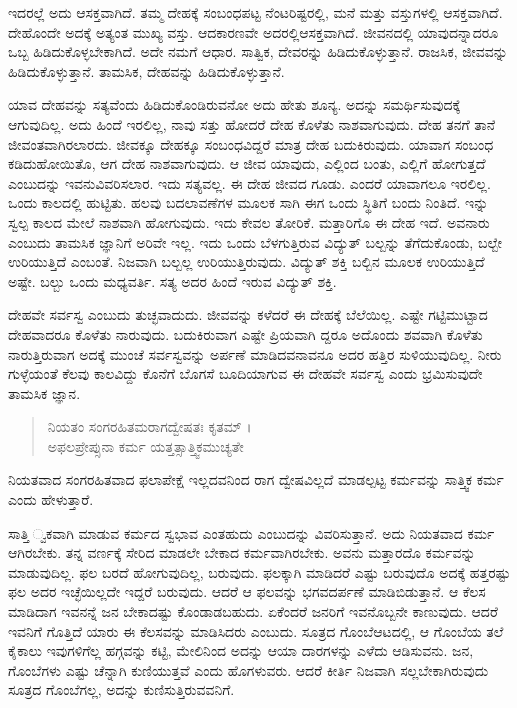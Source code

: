 ಇದರಲ್ಲೆ ಅದು ಆಸಕ್ತವಾಗಿದೆ. ತಮ್ಮ ದೇಹಕ್ಕೆ ಸಂಬಂಧಪಟ್ಟ ನೆಂಟರಿಷ್ಟರಲ್ಲಿ, ಮನೆ ಮತ್ತು ವಸ್ತುಗಳಲ್ಲಿ ಆಸಕ್ತವಾಗಿದೆ. ದೇಹೊಂದೇ ಅದಕ್ಕೆ ಅತ್ಯಂತ ಮುಖ್ಯ ವಸ್ತು. ಆದಕಾರಣವೇ ಅದರಲ್ಲಿಆಸಕ್ತವಾಗಿದೆ. ಜೀವನದಲ್ಲಿ ಯಾವುದನ್ನಾದರೂ ಒಬ್ಬ ಹಿಡಿದುಕೊಳ್ಳಬೇಕಾಗಿದೆ. ಅದೇ ನಮಗೆ ಆಧಾರ. ಸಾತ್ವಿಕ, ದೇವರನ್ನು ಹಿಡಿದುಕೊಳ್ಳುತ್ತಾನೆ. ರಾಜಸಿಕ, ಜೀವವನ್ನು ಹಿಡಿದುಕೊಳ್ಳುತ್ತಾನೆ. ತಾಮಸಿಕ, ದೇಹವನ್ನು ಹಿಡಿದುಕೊಳ್ಳುತ್ತಾನೆ.

ಯಾವ ದೇಹವನ್ನು ಸತ್ಯವೆಂದು ಹಿಡಿದುಕೊಂಡಿರುವನೋ ಅದು ಹೇತು ಶೂನ್ಯ. ಅದನ್ನು ಸಮರ್ಥಿಸುವುದಕ್ಕೆ ಆಗುವುದಿಲ್ಲ. ಅದು ಹಿಂದೆ ಇರಲಿಲ್ಲ, ನಾವು ಸತ್ತು ಹೋದರೆ ದೇಹ ಕೊಳೆತು ನಾಶವಾಗುವುದು. ದೇಹ ತನಗೆ ತಾನೆ ಜೀವಂತವಾಗಿರಲಾರದು. ಜೀವಕ್ಕೂ ದೇಹಕ್ಕೂ ಸಂಬಂಧವಿದ್ದರೆ ಮಾತ್ರ ದೇಹ ಬದುಕಿರುವುದು. ಯಾವಾಗ ಸಂಬಂಧ ಕಡಿದುಹೋಯಿತೊ, ಆಗ ದೇಹ ನಾಶವಾಗುವುದು. ಆ ಜೀವ ಯಾವುದು, ಎಲ್ಲಿಂದ ಬಂತು, ಎಲ್ಲಿಗೆ ಹೋಗುತ್ತದೆ ಎಂಬುದನ್ನು ಇವನುವಿವರಿಸಲಾರ. ಇದು ಸತ್ಯವಲ್ಲ. ಈ ದೇಹ ಜೀವದ ಗೂಡು. ಎಂದರೆ ಯಾವಾಗಲೂ ಇರಲಿಲ್ಲ. ಒಂದು ಕಾಲದಲ್ಲಿ ಹುಟ್ಟಿತು. ಹಲವು ಬದಲಾವಣೆಗಳ ಮೂಲಕ ಸಾಗಿ ಈಗ ಒಂದು ಸ್ಥಿತಿಗೆ ಬಂದು ನಿಂತಿದೆ. ಇನ್ನು ಸ್ವಲ್ಪ ಕಾಲದ ಮೇಲೆ ನಾಶವಾಗಿ ಹೋಗುವುದು. ಇದು ಕೇವಲ ತೋರಿಕೆ. ಮತ್ತಾರಿಗೊ ಈ ದೇಹ ಇದೆ. ಅವನಾರು ಎಂಬುದು ತಾಮಸಿಕ ಜ್ಞಾನಿಗೆ ಅರಿವೇ ಇಲ್ಲ. ಇದು ಒಂದು ಬೆಳಗುತ್ತಿರುವ ವಿದ್ಯುತ್ ಬಲ್ಬನ್ನು ತೆಗೆದುಕೊಂಡು, ಬಲ್ಬೇ ಉರಿಯುತ್ತಿದೆ ಎಂಬಂತೆ. ನಿಜವಾಗಿ ಬಲ್ಬಲ್ಲ ಉರಿಯುತ್ತಿರುವುದು. ವಿದ್ಯುತ್ ಶಕ್ತಿ ಬಲ್ಬಿನ ಮೂಲಕ ಉರಿಯುತ್ತಿದೆ ಅಷ್ಟೇ. ಬಲ್ಬು ಒಂದು ಮಧ್ಯವರ್ತಿ. ಸತ್ಯ ಅದರ ಹಿಂದೆ ಇರುವ ವಿದ್ಯುತ್ ಶಕ್ತಿ.

ದೇಹವೇ ಸರ್ವಸ್ವ ಎಂಬುದು ತುಚ್ಛವಾದುದು. ಜೀವವನ್ನು ಕಳೆದರೆ ಈ ದೇಹಕ್ಕೆ ಬೆಲೆಯಿಲ್ಲ. ಎಷ್ಟೇ ಗಟ್ಟಿಮುಟ್ಟಾದ ದೇಹವಾದರೂ ಕೊಳೆತು ನಾರುವುದು. ಬದುಕಿರುವಾಗ ಎಷ್ಟೇ ಪ್ರಿಯವಾಗಿ ದ್ದರೂ ಅದೊಂದು ಶವವಾಗಿ ಕೊಳೆತು ನಾರುತ್ತಿರುವಾಗ ಅದಕ್ಕೆ ಮುಂಚೆ ಸರ್ವಸ್ವವನ್ನು ಅರ್ಪಣೆ ಮಾಡಿದವನಾವನೂ ಅದರ ಹತ್ತಿರ ಸುಳಿಯುವುದಿಲ್ಲ. ನೀರು ಗುಳ್ಳೆಯಂತೆ ಕೆಲವು ಕಾಲವಿದ್ದು ಕೊನೆಗೆ ಬೊಗಸೆ ಬೂದಿಯಾಗುವ ಈ ದೇಹವೇ ಸರ್ವಸ್ವ ಎಂದು ಭ್ರಮಿಸುವುದೇ ತಾಮಸಿಕ ಜ್ಞಾನ.

\begin{verse}
ನಿಯತಂ ಸಂಗರಹಿತಮರಾಗದ್ವೇಷತಃ ಕೃತಮ್ ।\\ಅಫಲಪ್ರೇಪ್ಸುನಾ ಕರ್ಮ ಯತ್ತತ್ಸಾತ್ತ್ವಿಕಮುಚ್ಯತೇ 
\end{verse}

{\small ನಿಯತವಾದ ಸಂಗರಹಿತವಾದ ಫಲಾಪೇಕ್ಷೆ ಇಲ್ಲದವನಿಂದ ರಾಗ ದ್ವೇಷವಿಲ್ಲದೆ ಮಾಡಲ್ಪಟ್ಟ ಕರ್ಮವನ್ನು ಸಾತ್ತ್ವಿಕ ಕರ್ಮ ಎಂದು ಹೇಳುತ್ತಾರೆ.}

ಸಾತ್ತಿ ್ವಕವಾಗಿ ಮಾಡುವ ಕರ್ಮದ ಸ್ವಭಾವ ಎಂತಹುದು ಎಂಬುದನ್ನು ವಿವರಿಸುತ್ತಾನೆ. ಅದು ನಿಯತವಾದ ಕರ್ಮ ಆಗಿರಬೇಕು. ತನ್ನ ವರ್ಣಕ್ಕೆ ಸೇರಿದ ಮಾಡಲೇ ಬೇಕಾದ ಕರ್ಮವಾಗಿರಬೇಕು. ಅವನು ಮತ್ತಾರದೊ ಕರ್ಮವನ್ನು ಮಾಡುವುದಿಲ್ಲ. ಫಲ ಬರದೆ ಹೋಗುವುದಿಲ್ಲ, ಬರುವುದು. ಫಲಕ್ಕಾಗಿ ಮಾಡಿದರೆ ಎಷ್ಟು ಬರುವುದೊ ಅದಕ್ಕೆ ಹತ್ತರಷ್ಟು ಫಲ ಅದರ ಇಚ್ಛೆಯಿಲ್ಲದೇ ಇದ್ದರೆ ಬರುವುದು. ಆದರೆ ಆ ಫಲವನ್ನು ಭಗವದರ್ಪಣೆ ಮಾಡಿಬಿಡುತ್ತಾನೆ. ಆ ಕೆಲಸ ಮಾಡಿದಾಗ ಇವನನ್ನೆ ಜನ ಬೇಕಾದಷ್ಟು ಕೊಂಡಾಡಬಹುದು. ಏಕೆಂದರೆ ಜನರಿಗೆ ಇವನೊಬ್ಬನೇ ಕಾಣುವುದು. ಆದರೆ ಇವನಿಗೆ ಗೊತ್ತಿದೆ ಯಾರು ಈ ಕೆಲಸವನ್ನು ಮಾಡಿಸಿದರು ಎಂಬುದು. ಸೂತ್ರದ ಗೊಂಬೆಆಟದಲ್ಲಿ, ಆ ಗೊಂಬೆಯ ತಲೆ ಕೈಕಾಲು ಇವುಗಳಿಗೆಲ್ಲ ಹಗ್ಗವನ್ನು ಕಟ್ಟಿ, ಮೇಲಿನಿಂದ ಅದನ್ನು ಆಯಾ ದಾರಗಳನ್ನು ಎಳೆದು ಆಡಿಸುವನು. ಜನ, ಗೊಂಬೆಗಳು ಎಷ್ಟು ಚೆನ್ನಾಗಿ ಕುಣಿಯುತ್ತವೆ ಎಂದು ಹೊಗಳುವರು. ಆದರೆ ಕೀರ್ತಿ ನಿಜವಾಗಿ ಸಲ್ಲಬೇಕಾಗಿರುವುದು ಸೂತ್ರದ ಗೊಂಬೆಗಲ್ಲ, ಅದನ್ನು ಕುಣಿಸುತ್ತಿರುವವನಿಗೆ.


